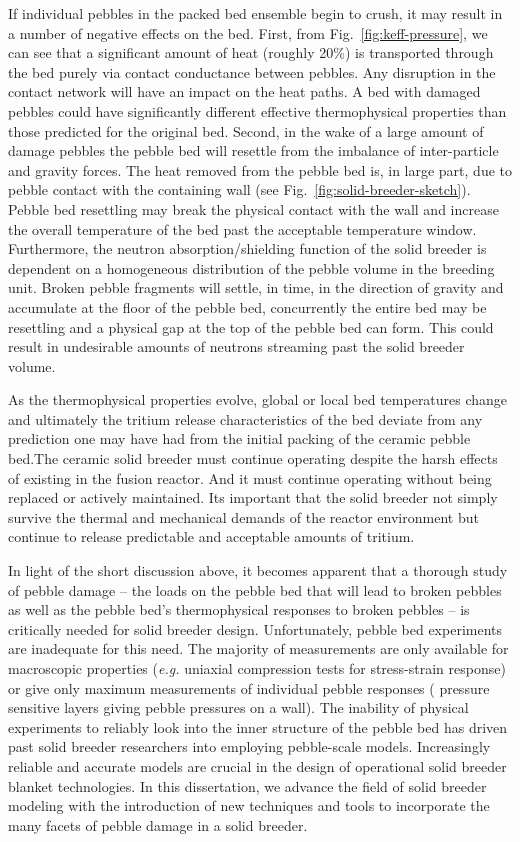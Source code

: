 If individual pebbles in the packed bed ensemble begin to crush, it may result in a number of negative effects on the bed. First, from Fig.~\ref{fig:keff-pressure}, we can see that a significant amount of heat (roughly 20\%) is transported through the bed purely via contact conductance between pebbles. Any disruption in the contact network will have an impact on the heat paths. A bed with damaged pebbles could have significantly different effective thermophysical properties than those predicted for the original bed. Second, in the wake of a large amount of damage pebbles the pebble bed will resettle from the imbalance of inter-particle and gravity forces. The heat removed from the pebble bed is, in large part, due to pebble contact with the containing wall (see Fig.~\ref{fig:solid-breeder-sketch}). Pebble bed resettling may break the physical contact with the wall and increase the overall temperature of the bed past the acceptable temperature window. Furthermore, the neutron absorption/shielding function of the solid breeder is dependent on a homogeneous distribution of the pebble volume in the breeding unit. Broken pebble fragments will settle, in time, in the direction of gravity and accumulate at the floor of the pebble bed, concurrently the entire bed may be resettling and a physical gap at the top of the pebble bed can form. This could result in undesirable amounts of neutrons streaming past the solid breeder volume. 

As the thermophysical properties evolve, global or local bed temperatures change and ultimately the tritium release characteristics of the bed deviate from any prediction one may have had from the initial packing of the ceramic pebble bed.The ceramic solid breeder must continue operating despite the harsh effects of existing in the fusion reactor. And it must continue operating without being replaced or actively maintained. Its important that the solid breeder not simply survive the thermal and mechanical demands of the reactor environment but continue to release predictable and acceptable amounts of tritium. 

In light of the short discussion above, it becomes apparent that a thorough study of pebble damage -- the loads on the pebble bed that will lead to broken pebbles as well as the pebble bed's thermophysical responses to broken pebbles -- is critically needed for solid breeder design. Unfortunately, pebble bed experiments are inadequate for this need. The majority of measurements are only available for macroscopic properties (\textit{e.g.} uniaxial compression tests for stress-strain response) or give only maximum measurements of individual pebble responses ( pressure sensitive layers giving pebble pressures on a wall). The inability of physical experiments to reliably look into the inner structure of the pebble bed has driven past solid breeder researchers into employing pebble-scale models. Increasingly reliable and accurate models are crucial in the design of operational solid breeder blanket technologies. In this dissertation, we advance the field of solid breeder modeling with the introduction of new techniques and tools to incorporate the many facets of pebble damage in a solid breeder.

